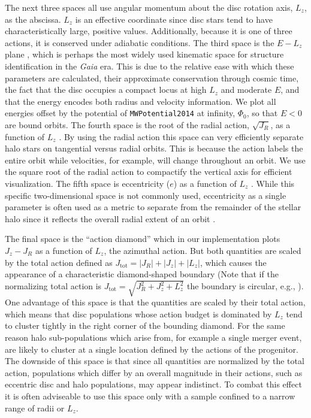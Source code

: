 The next three spaces all use angular momentum about the disc rotation axis, $L_{z}$, as the abscissa. $L_{z}$ is an effective coordinate since disc stars tend to have characteristically large, positive values. Additionally, because it is one of three actions, it is conserved under adiabatic conditions. The third space is the $E-L_{z}$ plane \parencite[e.g. ][]{helmi18,koppelman19b, naidu20,feuillet20,cordoni20,horta21a}, which is perhaps the most widely used kinematic space for structure identification in the \textit{Gaia} era. This is due to the relative ease with which these parameters are calculated, their approximate conservation through cosmic time, the fact that the disc occupies a compact locus at high $L_{z}$ and moderate $E$, and that the energy encodes both radius and velocity information. We plot all energies offset by the potential of \texttt{MWPotential2014} at infinity, $\Phi_{0}$, so that $E<0$ are bound orbits. The fourth space is the root of the radial action, $\sqrt{J_{R}}$, as a function of $L_{z}$ \parencite[e.g.][]{trick19,feuillet20,matsuno21,horta21a}. By using the radial action this space can very efficiently separate halo stars on tangential versus radial orbits. This is because the action labels the entire orbit while velocities, for example, will change throughout an orbit. We use the square root of the radial action to compactify the vertical axis for efficient visualization. The fifth space is eccentricity ($e$) as a function of $L_{z}$ \parencite[e.g.][]{cordoni20}. While this specific two-dimensional space is not commonly used, eccentricity as a single parameter is often used as a metric to separate \gse from the remainder of the stellar halo since it reflects the overall radial extent of an orbit \parencite[e.g.][]{belokurov18,mackereth20,naidu20}.

The final space is the ``action diamond'' \parencite[e.g. ][]{vasiliev19,myeong19,monty20,cordoni20,naidu20} which in our implementation plots $J_{z}-J_{R}$ as a function of $L_{z}$, the azimuthal action. But both quantities are scaled by the total action defined as $J_\mathrm{tot}=\lvert J_{R} \rvert + \lvert J_{z} \rvert + \lvert L_{z} \rvert$, which causes the appearance of a characteristic diamond-shaped boundary (Note that if the normalizing total action is $J_\mathrm{tot}= \sqrt{ J_{R}^{2} + J_{z}^{2} + L_{z}^{2}}$ the boundary is circular, e.g., \textcite{naidu20}). One advantage of this space is that the quantities are scaled by their total action, which means that disc populations whose action budget is dominated by $L_{z}$ tend to cluster tightly in the right corner of the bounding diamond. For the same reason halo sub-populations which arise from, for example a single merger event, are likely to cluster at a single location defined by the actions of the progenitor. The downside of this space is that since all quantities are normalized by the total action, populations which differ by an overall magnitude in their actions, such as eccentric disc and halo populations, may appear indistinct. To combat this effect it is often adviseable to use this space only with a sample confined to a narrow range of radii or $L_{z}$.

